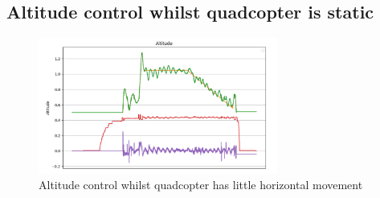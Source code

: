 \documentclass{article}
\begin{document}
\subsection*{Altitude control whilst quadcopter is static}
\begin{figure}[H]
  \centering
  \includegraphics[width=0.7\textwidth]{Pictures/Test_alitiude_control_little_movement.png}
  \caption{Altitude control whilst quadcopter has little horizontal movement}
  \label{fig:Altitude_control_no_movement}
\end{figure}
\end{document}
